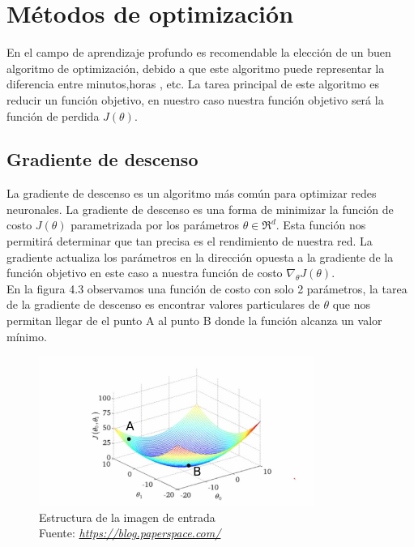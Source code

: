 \section{Métodos de optimización}
En el campo de aprendizaje profundo es recomendable la elección de un buen algoritmo de optimización, debido a que este algoritmo puede representar la diferencia entre minutos,horas , etc. La tarea principal de este algoritmo es reducir un función objetivo, en nuestro caso nuestra función objetivo será la función de perdida $J(\theta)$.

\subsection{Gradiente de descenso}
La gradiente de descenso es un algoritmo más común para optimizar redes neuronales. La gradiente de descenso es una forma de minimizar la función de costo $J(\theta)$ parametrizada por los parámetros $\theta \in\Re^{d}$. Esta función nos permitirá determinar que tan precisa es el rendimiento de nuestra red. La gradiente actualiza los parámetros en la dirección opuesta a la gradiente de la función objetivo en este caso a nuestra función de costo $\nabla_{\theta} J(\theta)$.\\ En la figura 4.3 observamos una función de costo con solo 2 parámetros, la tarea de la gradiente de descenso es encontrar valores particulares de $\theta$ que nos permitan llegar de el punto A al punto B donde la función alcanza un valor mínimo. 

\begin{figure}[H]
	\centering
	\includegraphics[width=0.8\textwidth]{Figures/gd.png}
	\caption{Estructura de la imagen de entrada \\ Fuente:  \href{https://blog.paperspace.com/intro-to-optimization-in-deep-learning-gradient-descent/}{\textit{https://blog.paperspace.com/}}}
	\label{image}
\end{figure} 

